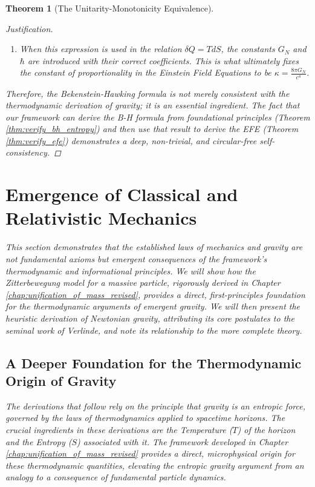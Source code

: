 \documentclass[11pt, letterpaper]{report}
\theoremstyle{plain} %
\newtheorem{theorem}{Theorem}[chapter]
\theoremstyle{definition} %
\theoremstyle{remark} %
\begin{document}
\begin{theorem}[The Unitarity-Monotonicity Equivalence]
\begin{proof}[Justification]
\begin{enumerate}
\begin{equation}
        dS = \frac{k_B}{4 L_P^2} dA = \frac{k_B c^3}{4\hbar G_N} dA.
        \label{eq:ds_da_link}
    \end{equation}
    \item When this expression is used in the relation $\delta Q = TdS$, the constants $G_N$ and $\hbar$ are introduced with their correct coefficients. This is what ultimately fixes the constant of proportionality in the Einstein Field Equations to be $\kappa = \frac{8\pi G_N}{c^4}$.
\end{enumerate}
Therefore, the Bekenstein-Hawking formula is not merely consistent with the thermodynamic derivation of gravity; it is an essential ingredient. The fact that our framework can derive the B-H formula from foundational principles (Theorem \ref{thm:verify_bh_entropy}) and then use that result to derive the EFE (Theorem \ref{thm:verify_efe}) demonstrates a deep, non-trivial, and circular-free self-consistency.
\end{proof}


\section{Emergence of Classical and Relativistic Mechanics}
\label{sec:verify_mechanics}

This section demonstrates that the established laws of mechanics and gravity are not fundamental axioms but emergent consequences of the framework’s thermodynamic and informational principles. We will show how the Zitterbewegung model for a massive particle, rigorously derived in Chapter \ref{chap:unification_of_mass_revised}, provides a direct, first-principles foundation for the thermodynamic arguments of emergent gravity. We will then present the heuristic derivation of Newtonian gravity, attributing its core postulates to the seminal work of Verlinde, and note its relationship to the more complete theory.

\subsection{A Deeper Foundation for the Thermodynamic Origin of Gravity}
\label{subsec:zbw_foundation_for_gravity}

The derivations that follow rely on the principle that gravity is an entropic force, governed by the laws of thermodynamics applied to spacetime horizons. The crucial ingredients in these derivations are the Temperature ($T$) of the horizon and the Entropy ($S$) associated with it. The framework developed in Chapter \ref{chap:unification_of_mass_revised} provides a direct, microphysical origin for these thermodynamic quantities, elevating the entropic gravity argument from an analogy to a consequence of fundamental particle dynamics.


\end{theorem}
\end{document}
